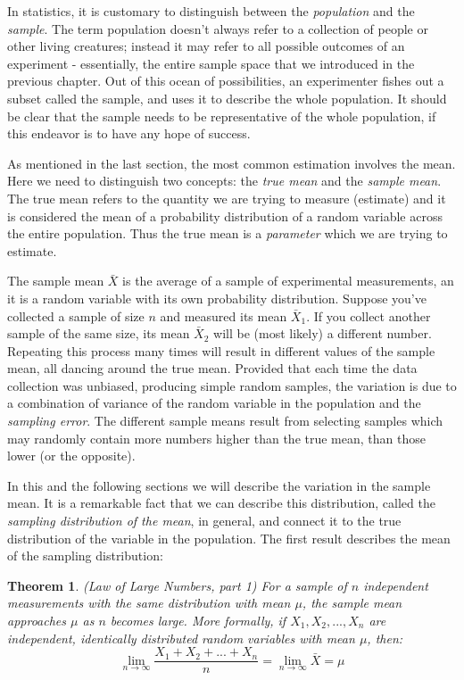 \documentclass[
]{book}
\newtheorem{theorem}{Theorem}[chapter]
\theoremstyle{definition}
\theoremstyle{definition}
\theoremstyle{definition}
\theoremstyle{remark}
\begin{document}
In statistics, it is customary to distinguish between the \emph{population} and the \emph{sample}. The term population doesn't always refer to a collection of people or other living creatures; instead it may refer to all possible outcomes of an experiment - essentially, the entire sample space that we introduced in the previous chapter. Out of this ocean of possibilities, an experimenter fishes out a subset called the sample, and uses it to describe the whole population. It should be clear that the sample needs to be representative of the whole population, if this endeavor is to have any hope of success.

As mentioned in the last section, the most common estimation involves the mean. Here we need to distinguish two concepts: the \emph{true mean} and the \emph{sample mean}. The true mean refers to the quantity we are trying to measure (estimate) and it is considered the mean of a probability distribution of a random variable across the entire population. Thus the true mean is a \emph{parameter} which we are trying to estimate.

The sample mean \(\bar X\) is the average of a sample of experimental measurements, an it is a random variable with its own probability distribution. Suppose you've collected a sample of size \(n\) and measured its mean \(\bar X_1\). If you collect another sample of the same size, its mean \(\bar X_2\) will be (most likely) a different number. Repeating this process many times will result in different values of the sample mean, all dancing around the true mean. Provided that each time the data collection was unbiased, producing simple random samples, the variation is due to a combination of variance of the random variable in the population and the \emph{sampling error}. The different sample means result from selecting samples which may randomly contain more numbers higher than the true mean, than those lower (or the opposite).

In this and the following sections we will describe the variation in the sample mean. It is a remarkable fact that we can describe this distribution, called the \emph{sampling distribution of the mean}, in general, and connect it to the true distribution of the variable in the population. The first result describes the mean of the sampling distribution:

\begin{theorem}
\protect\hypertarget{thm:LLN1}{}{\label{thm:LLN1} }(Law of Large Numbers, part 1) For a sample of \(n\) independent measurements with the same distribution with mean \(\mu\), the sample mean approaches \(\mu\) as \(n\) becomes large. More formally, if \(X_1, X_2, ... , X_n\) are independent, identically distributed random variables with mean \(\mu\), then:
\[ \lim_{n \rightarrow \infty}  \frac{X_1 + X_2 + ... + X_n} {n} =  \lim_{n \rightarrow \infty}  \bar X = \mu \]
\end{theorem}
\end{document}
